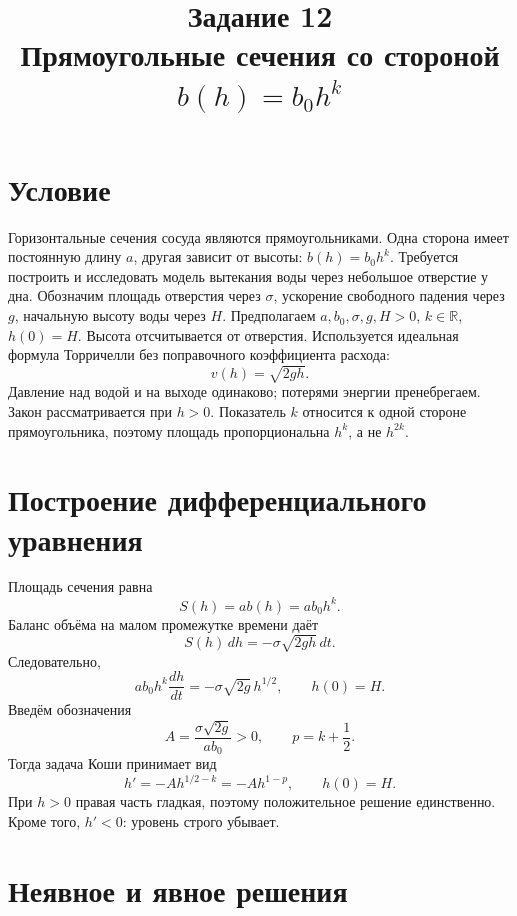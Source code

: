 ﻿\documentclass[12pt,a4paper]{article}
\title{Задание 12\\Прямоугольные сечения со стороной $b(h)=b_0h^k$}
\author{}
\date{}
\begin{document}
\maketitle

\section{Условие}
Горизонтальные сечения сосуда являются прямоугольниками. Одна сторона имеет постоянную длину $a$, другая зависит от высоты: $b(h)=b_0h^k$. Требуется построить и исследовать модель вытекания воды через небольшое отверстие у дна.
Обозначим площадь отверстия через $\sigma$, ускорение свободного падения через $g$, начальную высоту воды через $H$. Предполагаем $a,b_0,\sigma,g,H>0$, $k\in\mathbb R$, $h(0)=H$. Высота отсчитывается от отверстия. Используется идеальная формула Торричелли без поправочного коэффициента расхода:
\[
v(h)=\sqrt{2gh}.
\]
Давление над водой и на выходе одинаково; потерями энергии пренебрегаем. Закон рассматривается при $h>0$. Показатель $k$ относится к одной стороне прямоугольника, поэтому площадь пропорциональна $h^k$, а не $h^{2k}$.

\section{Построение дифференциального уравнения}
Площадь сечения равна
\[
S(h)=ab(h)=ab_0h^k.
\]
Баланс объёма на малом промежутке времени даёт
\[
S(h)\,dh=-\sigma\sqrt{2gh}\,dt.
\]
Следовательно,
\begin{equation}
\boxed{ab_0h^k\frac{dh}{dt}=-\sigma\sqrt{2g}\,h^{1/2},\qquad h(0)=H.}
\end{equation}
Введём обозначения
\[
A=\frac{\sigma\sqrt{2g}}{ab_0}>0,\qquad p=k+\frac12.
\]
Тогда задача Коши принимает вид
\begin{equation}
\boxed{h'=-Ah^{1/2-k}=-Ah^{1-p},\qquad h(0)=H.}
\end{equation}
При $h>0$ правая часть гладкая, поэтому положительное решение единственно. Кроме того, $h'<0$: уровень строго убывает.

\section{Неявное и явное решения}
\end{document}
